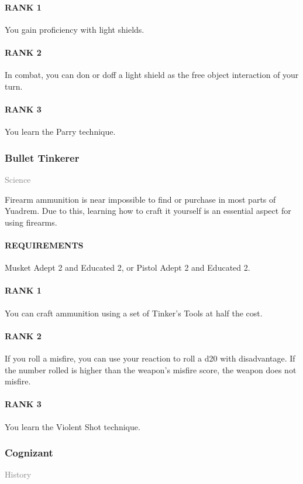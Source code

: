 \paragraph{RANK 1} You gain proficiency with light shields.
\paragraph{RANK 2} In combat, you can don or doff a light shield as the free object interaction of your turn.
\paragraph{RANK 3} You learn the Parry technique.

\subsubsection{Bullet Tinkerer} \label{tal::bullettinkerer}
\small{\textcolor{gray}{Science}}

\normalsize
Firearm ammunition is near impossible to find or purchase in most parts of Yuadrem.
Due to this, learning how to craft it yourself is an essential aspect for using firearms.
\paragraph{REQUIREMENTS} Musket Adept 2 and Educated 2, or Pistol Adept 2 and Educated 2.
\paragraph{RANK 1} You can craft ammunition using a set of Tinker's Tools at half the cost.
\paragraph{RANK 2} If you roll a misfire, you can use your reaction to roll a d20 with disadvantage.
If the number rolled is higher than the weapon's misfire score, the weapon does not misfire.
\paragraph{RANK 3} You learn the Violent Shot technique.

\subsubsection{Cognizant} \label{tal::cognizant}
\small{\textcolor{gray}{History}}

